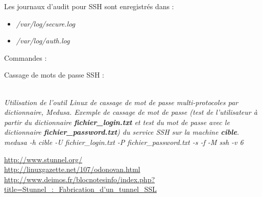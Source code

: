 \documentclass[a4paper,11pt]{article}				    %
\begin{document}
{\begin{LARGE}Les journaux d'audit pour SSH sont enregistr\'es dans :\end{LARGE}
\begin{itemize}
	\item {\sl \color{blue}/var/log/secure.log}
	\item {\sl \color{blue}/var/log/auth.log}\\
\end{itemize}

\begin{LARGE}Commandes : \end{LARGE}

\begin{LARGE}Cassage de mots de passe SSH : \end{LARGE}\\
\textit{Utilisation de l'outil Linux de cassage de mot de passe multi-protocoles par dictionnaire, Medusa. Exemple de cassage de mot de passe (test de l'utilisateur \`a partir du dictionnaire \textbf{fichier\_login.txt} et test du mot de passe avec le dictionnaire \textbf{fichier\_password.txt}) du service SSH sur la machine \textbf{cible}.}\\
{\sl \color{blue}medusa -h cible -U fichier\_login.txt -P fichier\_password.txt -s -f -M ssh -v 6}
}
{\url{http://www.stunnel.org/}\\
\url{http://linuxgazette.net/107/odonovan.html}\\
\url{http://www.deimos.fr/blocnotesinfo/index.php?title=Stunnel_:_Fabrication_d'un_tunnel_SSL}}
\end{document}
